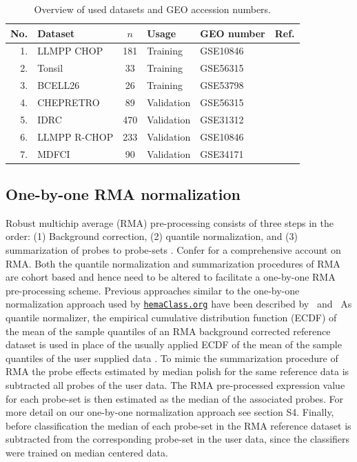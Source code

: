 \documentclass[10pt,letterpaper]{article}
\newcommand{\hemaClass}{\href{http://hemaClass.org}{\texttt{hemaClass.org}}}
\begin{document}
%
\begin{table}%
	\small
	\caption{Overview of used datasets and GEO accession numbers.}
	\label{table:01}%
	\begin{center}
		\begin{tabular}{rlclll}
			\hline\hline
			No. & Dataset & $n$ & Usage & GEO number & Ref.
			\\
			\hline
			1. & LLMPP CHOP & 181 & Training & GSE10846 & \cite{Lenz2008a}
			\\
			2. & Tonsil & 33 & Training & GSE56315 & \cite{DybkaerBoegsted2015}
			\\
			3. & BCELL26 & 26 & Training & GSE53798 & \cite{Falgreen2015}
			\\
			4. & CHEPRETRO & 89 & Validation & GSE56315 & \cite{DybkaerBoegsted2015}
			\\
			5. & IDRC & 470 & Validation & GSE31312 & \cite{Visco2012}
			\\
			6. & LLMPP R-CHOP & 233 & Validation & GSE10846 & \cite{Lenz2008a}
			\\
			7. & MDFCI & 90 & Validation & GSE34171 & \cite{Monti2012a}\\
			\hline
		\end{tabular}
	\end{center}
\end{table}

\subsection*{One-by-one RMA normalization}
Robust multichip average (RMA) pre-processing consists of three steps in the order:
(1) Background correction,
(2) quantile normalization, and
(3) summarization of probes to probe-sets \cite{Irizarry2003,Irizarry2003b}.
Confer \cite{Bolstad2004} for a comprehensive account on RMA.
Both the quantile normalization and summarization procedures of RMA are cohort based and hence need to be altered to facilitate a one-by-one RMA pre-processing scheme. Previous approaches similar to the one-by-one normalization approach used by \hemaClass{} have been described by \mbox{\cite{Katz2006} and \cite{McCall2010}}
As quantile normalizer, the empirical cumulative distribution function (ECDF) of the mean of the sample quantiles of an RMA background corrected reference dataset is used in place of the usually applied ECDF of the mean of the sample quantiles of the user supplied data \mbox{\cite{Bolstad2003}}.
To mimic the summarization procedure of RMA \mbox{\cite{Irizarry2003b}} the probe effects estimated by median polish for the same reference data is subtracted all probes of the user data.
The RMA pre-processed expression value for each probe-set is then estimated as the median of the associated probes. For more detail on our one-by-one normalization approach see  section S4. Finally, before classification the median of each probe-set in the RMA reference dataset is subtracted from the corresponding probe-set in the user data, since the classifiers were trained on median centered data. 
\end{document}

